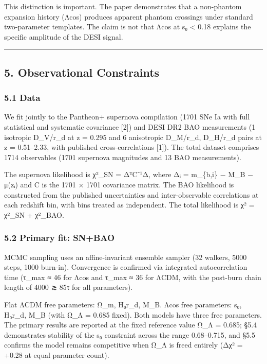 This distinction is important. The paper demonstrates that a non-phantom
expansion history (Λcos) produces apparent phantom crossings under
standard two-parameter templates. The claim is not that Λcos at s₀
\textless{} 0.18 explains the specific amplitude of the DESI signal.

\begin{center}\rule{0.5\linewidth}{0.5pt}\end{center}

\subsection{5. Observational
Constraints}\label{observational-constraints}

\subsubsection{5.1 Data}\label{data}

We fit jointly to the Pantheon+ supernova compilation (1701 SNe Ia with
full statistical and systematic covariance {[}2{]}) and DESI DR2 BAO
measurements (1 isotropic D\_V/r\_d at z = 0.295 and 6 anisotropic
D\_M/r\_d, D\_H/r\_d pairs at z = 0.51--2.33, with published
cross-correlations {[}1{]}). The total dataset comprises 1714
observables (1701 supernova magnitudes and 13 BAO measurements).

The supernova likelihood is χ²\_SN = ΔᵀC⁻¹Δ, where Δᵢ = m\_\{b,i\} −
M\_B − μ(zᵢ) and C is the 1701 × 1701 covariance matrix. The BAO
likelihood is constructed from the published uncertainties and
inter-observable correlations at each redshift bin, with bins treated as
independent. The total likelihood is χ² = χ²\_SN + χ²\_BAO.

\subsubsection{5.2 Primary fit: SN+BAO}\label{primary-fit-snbao}

MCMC sampling uses an affine-invariant ensemble sampler (32 walkers,
5000 steps, 1000 burn-in). Convergence is confirmed via integrated
autocorrelation time (τ\_max ≈ 46 for Λcos and τ\_max ≈ 36 for ΛCDM,
with the post-burn chain length of 4000 ≳ 85τ for all parameters).

Flat ΛCDM free parameters: Ω\_m, H₀r\_d, M\_B. Λcos free parameters: s₀,
H₀r\_d, M\_B (with Ω\_Λ = 0.685 fixed). Both models have three free
parameters. The primary results are reported at the fixed reference
value Ω\_Λ = 0.685; §5.4 demonstrates stability of the s₀ constraint
across the range 0.68--0.715, and §5.5 confirms the model remains
competitive when Ω\_Λ is freed entirely (Δχ² = +0.28 at equal parameter
count).

